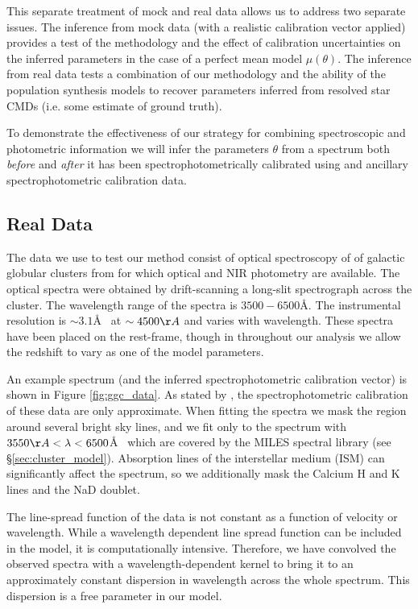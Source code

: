 \documentclass[iop,numberedappendix]{emulateapj}
\begin{document}
This separate treatment of mock and real data allows us to address two
separate issues.  The inference from mock data (with a realistic
calibration vector applied) provides a test of the methodology and the
effect of calibration uncertainties on the inferred parameters in the
case of a perfect mean model $\mu(\theta)$.  The inference from real
data tests a combination of our methodology and the ability of the
population synthesis models to recover parameters inferred from
resolved star CMDs (i.e. some estimate of ground truth).

To demonstrate the effectiveness of our strategy for combining
spectroscopic and photometric information we will infer the parameters
$\theta$ from a spectrum both \emph{before} and \emph{after} it has
been spectrophotometrically calibrated using and ancillary
spectrophotometric calibration data.


\subsection{Real Data}

The data we use to test our method consist of optical spectroscopy of
of galactic globular clusters from \citet{schiavon05} for which
optical and NIR photometry are available. The optical spectra were
obtained by drift-scanning a long-slit spectrograph across the
cluster.  The wavelength range of the spectra is $3500-6500$\AA. The
instrumental resolution is $\sim 3.1$\AA~ at $\sim 4500\AA$ and varies
with wavelength.  These spectra have been placed on the rest-frame,
though in throughout our analysis we allow the redshift to vary as one
of the model parameters. 

An example spectrum (and the inferred spectrophotometric calibration
vector) is shown in Figure \ref{fig:ggc_data}.  As stated by
\citet{schiavon05}, the spectrophotometric calibration of these data
are only approximate.  When fitting the spectra we mask the region
around  several bright sky lines, and we fit only to the spectrum
with $3550\AA < \lambda < 6500$\AA~ which are covered by the MILES
spectral library (see \S\ref{sec:cluster_model}).  Absorption lines of
the interstellar medium (ISM) can significantly affect the spectrum,
so we additionally mask the Calcium H and K lines and the NaD doublet.

The line-spread function of the data is not constant as a function of
velocity or wavelength.  While a wavelength dependent line spread
function can be included in the model, it is computationally
intensive. Therefore, we have convolved the observed spectra with a
wavelength-dependent kernel to bring it to an approximately constant
dispersion in wavelength across the whole spectrum. This dispersion is
a free parameter in our model.
\end{document}
